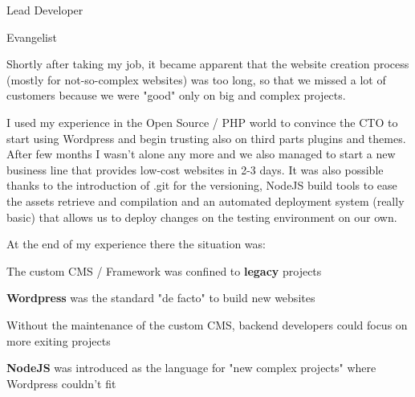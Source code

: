 \sectionspace


\begin{minipage}[t]{0.33\textwidth} %


\begin{tightitemize}
\item Lead Developer
\item Evangelist
\end{tightitemize}

\end{minipage} %
\hfill
\begin{minipage}[t]{0.66\textwidth} %

\vspace{\topsep} %

Shortly after taking my job, it became apparent that the website creation process (mostly for not-so-complex websites) was too long, so that we missed a lot of customers because we were "good" only on big and complex projects. 

I used my experience in the Open Source / PHP world to convince the CTO to start using Wordpress and begin trusting also on third parts plugins and themes. After few months I wasn't alone any more and we also managed to start a new business line that provides low-cost websites in 2-3 days. It was also possible thanks to the introduction of .git for the versioning, NodeJS build tools to ease the assets retrieve and compilation and an automated deployment system (really basic) that allows us to deploy changes on the testing environment on our own.

At the end of my experience there the situation was:

\begin{tightitemize}
\item The custom CMS / Framework was confined to \textbf{legacy} projects
\item \textbf{Wordpress} was the standard "de facto" to build new websites
\item Without the maintenance of the custom CMS, backend developers could focus on more exiting projects
\item \textbf{NodeJS} was introduced as the language for "new complex projects" where Wordpress couldn't fit
\end{tightitemize}

\end{minipage} %

